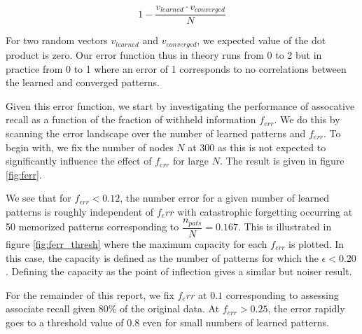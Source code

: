 \documentclass{article}
\begin{document}
\begin{equation}
1 - \dfrac{v_{learned}\cdot v_{converged}}{N}
\end{equation}

For two random vectors $v_{learned}$ and $v_{converged}$, we expected value of the dot product is zero. Our error function thus in theory runs from 0 to 2 but in practice from 0 to 1 where an error of 1 corresponds to no correlations between the learned and converged patterns.

Given this error function, we start by investigating the performance of assocative recall as a function of the fraction of withheld information $f_{err}$. We do this by scanning the error landscape over the number of learned patterns and $f_{err}$.
To begin with, we fix the number of nodes $N$ at 300 as this is not expected to significantly influence the effect of $f_{err}$ for large $N$. The result is given in figure \ref{fig:ferr}.

We see that for $f_{err} < 0.12$,  the number error for a given number of learned patterns is roughly independent of $f_err$ with catastrophic forgetting occurring at 50 memorized patterns corresponding to $\dfrac{n_{pats}}{N} = 0.167$. This is illustrated in figure \ref{fig:ferr_thresh} where the maximum capacity for each $f_{err}$ is plotted. In this case, the capacity is defined as the number of patterns for which the $\epsilon < 0.20$. Defining the capacity as the point of inflection gives a similar but noiser result.

For the remainder of this report, we fix $f_err$ at $0.1$ corresponding to assessing associate recall given $80\%$ of the original data. At $f_{err} > 0.25$, the error rapidly goes to a threshold value of $0.8$ even for small numbers of learned patterns.
\end{document}
